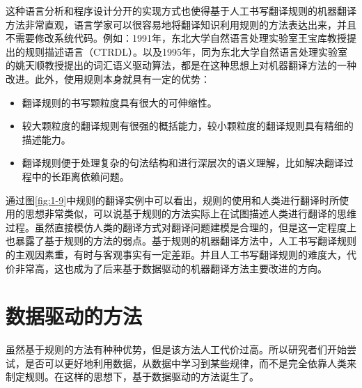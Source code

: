 \parinterval 这种语言分析和程序设计分开的实现方式也使得基于人工书写翻译规则的机器翻译方法非常直观，语言学家可以很容易地将翻译知识利用规则的方法表达出来，并且不需要修改系统代码。例如：1991年，东北大学自然语言处理实验室王宝库教授提出的规则描述语言（CTRDL）。以及1995年，同为东北大学自然语言处理实验室的姚天顺教授提出的词汇语义驱动算法，都是在这种思想上对机器翻译方法的一种改进。此外，使用规则本身就具有一定的优势：

\begin{itemize}
\vspace{0.5em}
\item 翻译规则的书写颗粒度具有很大的可伸缩性。
\vspace{0.5em}
\item 较大颗粒度的翻译规则有很强的概括能力，较小颗粒度的翻译规则具有精细的描述能力。
\vspace{0.5em}
\item 翻译规则便于处理复杂的句法结构和进行深层次的语义理解，比如解决翻译过程中的长距离依赖问题。
\vspace{0.5em}
\end{itemize}

\parinterval 通过图\ref{fig:1-9}中规则的翻译实例中可以看出，规则的使用和人类进行翻译时所使用的思想非常类似，可以说基于规则的方法实际上在试图描述人类进行翻译的思维过程。虽然直接模仿人类的翻译方式对翻译问题建模是合理的，但是这一定程度上也暴露了基于规则的方法的弱点。基于规则的机器翻译方法中，人工书写翻译规则的主观因素重，有时与客观事实有一定差距。并且人工书写翻译规则的难度大，代价非常高，这也成为了后来基于数据驱动的机器翻译方法主要改进的方向。


\sectionnewpage
\section{数据驱动的方法}
\parinterval 虽然基于规则的方法有种种优势，但是该方法人工代价过高。所以研究者们开始尝试，是否可以更好地利用数据，从数据中学习到某些规律，而不是完全依靠人类来制定规则。在这样的思想下，基于数据驱动的方法诞生了。


